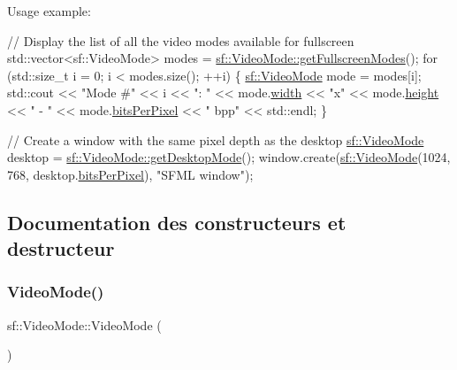 Usage example\+: 
\begin{DoxyCode}
\textcolor{comment}{// Display the list of all the video modes available for fullscreen}
std::vector<sf::VideoMode> modes = \hyperlink{classsf_1_1VideoMode_a6815b9b3b35767d5b4563fbed4bfc67b}{sf::VideoMode::getFullscreenModes}();
\textcolor{keywordflow}{for} (std::size\_t i = 0; i < modes.size(); ++i)
\{
    \hyperlink{classsf_1_1VideoMode}{sf::VideoMode} mode = modes[i];
    std::cout << \textcolor{stringliteral}{"Mode #"} << i << \textcolor{stringliteral}{": "}
              << mode.\hyperlink{classsf_1_1VideoMode_a9b3b2ad2cac6b9c266823fb5ed506d90}{width} << \textcolor{stringliteral}{"x"} << mode.\hyperlink{classsf_1_1VideoMode_a5a88d44c9470db7474361a42a189342d}{height} << \textcolor{stringliteral}{" - "}
              << mode.\hyperlink{classsf_1_1VideoMode_aa080f1ef96a1008d58b1920eceb189df}{bitsPerPixel} << \textcolor{stringliteral}{" bpp"} << std::endl;
\}

\textcolor{comment}{// Create a window with the same pixel depth as the desktop}
\hyperlink{classsf_1_1VideoMode}{sf::VideoMode} desktop = \hyperlink{classsf_1_1VideoMode_ac1be160a4342e6eafb2cb0e8c9b18d44}{sf::VideoMode::getDesktopMode}();
window.create(\hyperlink{classsf_1_1VideoMode}{sf::VideoMode}(1024, 768, desktop.\hyperlink{classsf_1_1VideoMode_aa080f1ef96a1008d58b1920eceb189df}{bitsPerPixel}), \textcolor{stringliteral}{"SFML window"});
\end{DoxyCode}
 

\subsection{Documentation des constructeurs et destructeur}
\mbox{\label{classsf_1_1VideoMode_a04c9417e5c304510bef5f6aeb03f6ce1}} 
\subsubsection{\texorpdfstring{Video\+Mode()}{VideoMode()}\hspace{0.1cm}{\footnotesize\ttfamily [1/2]}}
{\footnotesize\ttfamily sf\+::\+Video\+Mode\+::\+Video\+Mode (\begin{DoxyParamCaption}{ }\end{DoxyParamCaption})}



